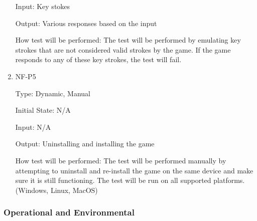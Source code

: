 \documentclass[12pt, titlepage]{article}
\begin{document}
\begin{enumerate}
Input: Key stokes
					
Output: Various responses based on the input
					
How test will be performed: The test will be performed by emulating key strokes that are not considered valid strokes by the game. If the game responds to any of these key strokes, the test will fail.

\item{NF-P5\\}

Type: Dynamic, Manual
					
Initial State: N/A
					
Input: N/A
					
Output: Uninstalling and installing the game
					
How test will be performed: The test will be performed manually by attempting to uninstall and re-install the game on the same device and make sure it is still functioning. The test will be run on all supported platforms. (Windows, Linux, MacOS)


\end{enumerate}

\subsubsection{Operational and Environmental}
\end{document}

